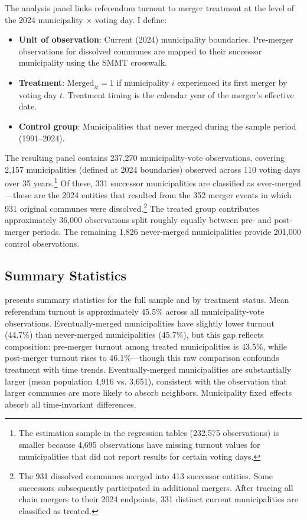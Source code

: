 \documentclass[12pt]{article}
\begin{document}
The analysis panel links referendum turnout to merger treatment at the level of the 2024 municipality $\times$ voting day. I define:
\begin{itemize}
    \item \textbf{Unit of observation}: Current (2024) municipality boundaries. Pre-merger observations for dissolved communes are mapped to their successor municipality using the SMMT crosswalk.
    \item \textbf{Treatment}: $\text{Merged}_{it} = 1$ if municipality $i$ experienced its first merger by voting day $t$. Treatment timing is the calendar year of the merger's effective date.
    \item \textbf{Control group}: Municipalities that never merged during the sample period (1991--2024).
\end{itemize}

The resulting panel contains 237,270 municipality-vote observations, covering 2,157 municipalities (defined at 2024 boundaries) observed across 110 voting days over 35 years.\footnote{The estimation sample in the regression tables (232,575 observations) is smaller because 4,695 observations have missing turnout values for municipalities that did not report results for certain voting days.} Of these, 331 successor municipalities are classified as ever-merged---these are the 2024 entities that resulted from the 352 merger events in which 931 original communes were dissolved.\footnote{The 931 dissolved communes merged into 413 successor entities. Some successors subsequently participated in additional mergers. After tracing all chain mergers to their 2024 endpoints, 331 distinct current municipalities are classified as treated.} The treated group contributes approximately 36,000 observations split roughly equally between pre- and post-merger periods. The remaining 1,826 never-merged municipalities provide 201,000 control observations.

\subsection{Summary Statistics}

 presents summary statistics for the full sample and by treatment status. Mean referendum turnout is approximately 45.5\% across all municipality-vote observations. Eventually-merged municipalities have slightly lower turnout (44.7\%) than never-merged municipalities (45.7\%), but this gap reflects composition: pre-merger turnout among treated municipalities is 43.5\%, while post-merger turnout rises to 46.1\%---though this raw comparison confounds treatment with time trends. Eventually-merged municipalities are substantially larger (mean population 4,916 vs. 3,651), consistent with the observation that larger communes are more likely to absorb neighbors. Municipality fixed effects absorb all time-invariant differences.
\end{document}

